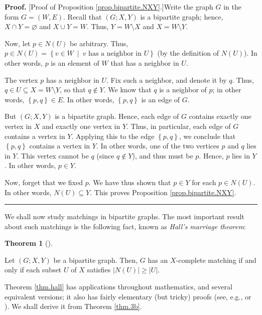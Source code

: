 \documentclass[numbers=enddot,12pt,final,onecolumn,notitlepage]{scrartcl}%
\theoremstyle{definition}
\newtheorem{theo}{Theorem}[section]
\newenvironment{theorem}[1][]
{\begin{theo}[#1]\begin{leftbar}}
{\end{leftbar}\end{theo}}
\newenvironment{proof}[1][Proof]{\noindent\textbf{#1.} }{\ \rule{0.5em}{0.5em}}
\begin{document}
\begin{proof}
[Proof of Proposition \ref{prop.bipartite.NXY}.]Write the graph $G$ in the
form $G=\left(  W,E\right)  $. Recall that $\left(  G;X,Y\right)  $ is a
bipartite graph; hence, $X\cap Y=\varnothing$ and $X\cup Y=W$. Thus,
$Y=W\setminus X$ and $X=W\setminus Y$.

Now, let $p\in N\left(  U\right)  $ be arbitrary. Thus, $p\in N\left(
U\right)  =\left\{  v\in W\ \mid\ v\text{ has a neighbor in }U\right\}  $ (by
the definition of $N\left(  U\right)  $). In other words, $p$ is an element of
$W$ that has a neighbor in $U$.

The vertex $p$ has a neighbor in $U$. Fix such a neighbor, and denote it by
$q$. Thus, $q\in U\subseteq X=W\setminus Y$, so that $q\notin Y$. We know that
$q$ is a neighbor of $p$; in other words, $\left\{  p,q\right\}  \in E$. In
other words, $\left\{  p,q\right\}  $ is an edge of $G$.

But $\left(  G;X,Y\right)  $ is a bipartite graph. Hence, each edge of $G$
contains exactly one vertex in $X$ and exactly one vertex in $Y$. Thus, in
particular, each edge of $G$ contains a vertex in $Y$. Applying this to the
edge $\left\{  p,q\right\}  $, we conclude that $\left\{  p,q\right\}  $
contains a vertex in $Y$. In other words, one of the two vertices $p$ and $q$
lies in $Y$. This vertex cannot be $q$ (since $q\notin Y$), and thus must be
$p$. Hence, $p$ lies in $Y$. In other words, $p\in Y$.

Now, forget that we fixed $p$. We have thus shown that $p\in Y$ for each $p\in
N\left(  U\right)  $. In other words, $N\left(  U\right)  \subseteq Y$. This
proves Proposition \ref{prop.bipartite.NXY}.
\end{proof}

We shall now study matchings in bipartite graphs. The most important result
about such matchings is the following fact, known as \textit{Hall's marriage
theorem}:

\begin{theorem}
\label{thm.hall}Let $\left(  G;X,Y\right)  $ be a bipartite graph. Then, $G$
has an $X$-complete matching if and only if each subset $U$ of $X$ satisfies
$\left\vert N\left(  U\right)  \right\vert \geq\left\vert U\right\vert $.
\end{theorem}

Theorem \ref{thm.hall} has applications throughout mathematics, and several
equivalent versions; it also has fairly elementary (but tricky) proofs (see,
e.g., \cite[\S 12.5.2]{LeLeMe17} or \cite[Theorem 3.9]{Harju14}). We shall
derive it from Theorem \ref{thm.3b}.
\end{document}
